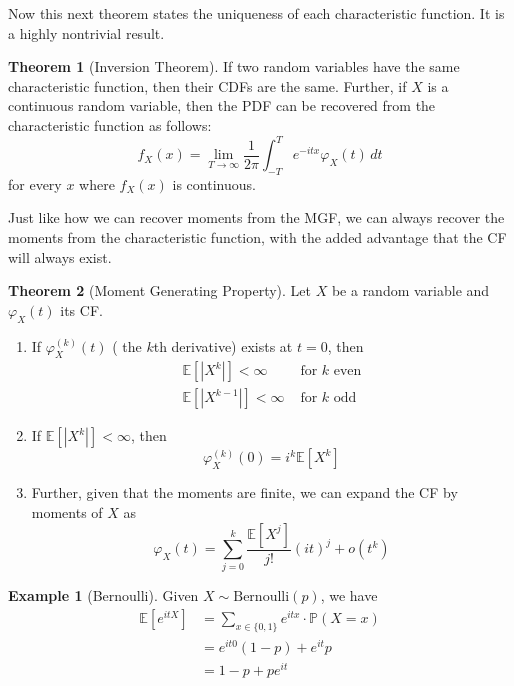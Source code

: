 \documentclass{article}
\theoremstyle{definition}
\newtheorem{theorem}{Theorem}[section]
\newtheorem{example}{Example}[section]
\theoremstyle{remark}
\theoremstyle{definition}
\begin{document}
Now this next theorem states the uniqueness of each characteristic function. It is a highly nontrivial result. 

\begin{theorem}[Inversion Theorem]
If two random variables have the same characteristic function, then their CDFs are the same. Further, if $X$ is a continuous random variable, then the PDF can be recovered from the characteristic function as follows: 
\[f_X (x) = \lim_{T \rightarrow \infty} \frac{1}{2 \pi} \int_{-T}^T e^{- i t x} \varphi_X (t) \,dt\]
for every $x$ where $f_X (x)$ is continuous. 
\end{theorem}

Just like how we can recover moments from the MGF, we can always recover the moments from the characteristic function, with the added advantage that the CF will always exist. 

\begin{theorem}[Moment Generating Property]
Let $X$ be a random variable and $\varphi_X (t)$ its CF. 
\begin{enumerate}
    \item If $\varphi_X^{(k)} (t)$ ( the $k$th derivative) exists at $t = 0$, then 
    \begin{align*}
        \mathbb{E}[|X^k|] < \infty & \text{ for } k \text{ even} \\
        \mathbb{E}[|X^{k-1}|] < \infty & \text{ for } k \text{ odd}
    \end{align*}
    
    \item If $\mathbb{E}[|X^k|] < \infty$, then 
    \[\varphi_X^{(k)} (0) = i^k \mathbb{E}[X^k]\] 
    
    \item Further, given that the moments are finite, we can expand the CF by moments of $X$ as 
    \[\varphi_X (t) = \sum_{j=0}^k \frac{\mathbb{E}[X^j]}{j!} (i t)^j + o(t^k)\]
\end{enumerate}
\end{theorem}

\begin{example}[Bernoulli]
Given $X \sim \mathrm{Bernoulli}(p)$, we have 
\begin{align*}
    \mathbb{E}[ e^{i t X}] & = \sum_{x \in \{0, 1\}} e^{i t x} \cdot \mathbb{P}(X = x) \\
    & = e^{i t 0} (1 - p) + e^{i t} p \\
    & = 1 - p + p e^{i t}
\end{align*}
\end{example}
\end{document}
